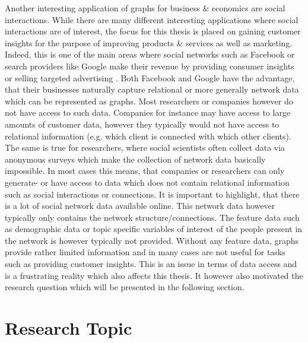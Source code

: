 	\noindent Another interesting application of graphs for business \& 
	economics are social interactions. While there are many different
	interesting applications where social interactions are of interest,
	the focus for this thesis is placed on gaining customer insights for the 
	purpose of improving products \& services as well as marketing. Indeed, 
	this is one of the main areas where social networks such as Facebook or 
	search providers like Google make their revenue by providing consumer
	insights or selling targeted advertising \citep{Facebook2021,Alphabet2021}. 
	Both Facebook and Google have the advantage, that their businesses 
	naturally capture relational or more generally network data which can be 
	represented as graphs. Most researchers or companies however do not have 
	access to such data. Companies for instance may have access to large 
	amounts of customer data, however they typically would not have access to 
	relational information (e.g. which client is connected with which other 
	clients). The same is true for researchers, where social scientists often 
	collect data via anonymous surveys which make the collection of network
	data basically impossible. In most cases this means, that companies or
	researchers can only generate- or have access to data which does not
	contain relational information such as social interactions or connections. 
	It is important to highlight, that there is a lot of social network data 
	available online. This network data however typically only contains the 
	network structure/connections. The feature data such as demographic data or
	topic specific variables of interest of the people present in the network 
	is however typically not provided. Without any feature data, graphs provide 
	rather limited information and in many cases are not useful for tasks such
	as providing customer insights. This is an issue in terms of data access 
	and is a frustrating reality which also affects this thesis. It however also
	motivated the research question which will be presented in the following 
	section.
	
	\section{Research Topic}
	\label{section:research_topics}

